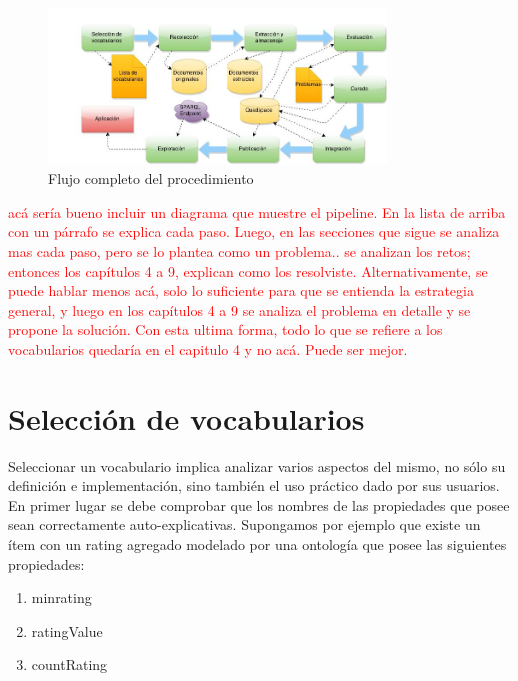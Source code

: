 \begin{figure}
    \centering
    \includegraphics[width=0.8\textwidth,natwidth=610,natheight=642]{proceso}
    \caption{Flujo completo del procedimiento}
\end{figure}

\begin{framed}
\textcolor{red}{acá sería bueno incluir un diagrama que muestre el pipeline. En la lista de arriba con un párrafo se explica cada paso. Luego, en las secciones que sigue se analiza mas cada paso, pero se lo plantea como un problema.. se analizan los retos; entonces los capítulos 4 a 9, explican como los resolviste. Alternativamente, se puede hablar menos acá, solo lo suficiente para que se entienda la estrategia general, y luego en los capítulos 4 a 9 se analiza el problema en detalle y se propone la solución. Con esta ultima forma, todo lo que se refiere a los vocabularios quedaría en el capitulo 4 y no acá. Puede ser mejor.}
\end{framed}

\section{Selección de vocabularios}

\noindent Seleccionar un vocabulario implica analizar varios aspectos del mismo, no sólo su definición e implementación, sino también el uso práctico dado por sus usuarios. 
En primer lugar se debe comprobar que los nombres de las propiedades que posee sean correctamente auto-explicativas. Supongamos por ejemplo que existe un ítem con un rating agregado modelado por una ontología que posee las siguientes propiedades:

\begin{enumerate}
\item minrating
\item ratingValue
\item countRating
\end{enumerate}



